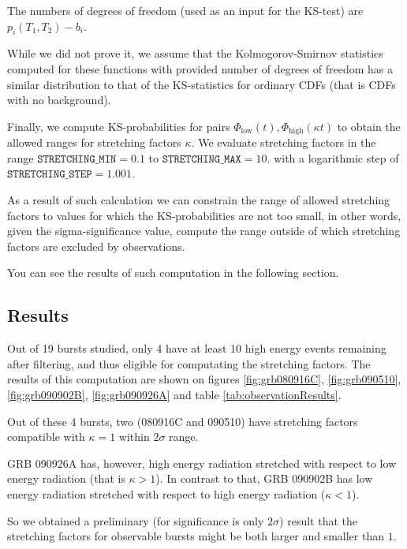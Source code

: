 \documentclass{article}
\begin{document}
The numbers of degrees of freedom (used as an input for the KS-test) are $p_i\left(T_1, T_2\right) - b_i$.

While we did not prove it, we assume that the Kolmogorov-Smirnov statistics computed for these functions with provided number of degrees of freedom has a similar distribution to that of the KS-statistics for ordinary CDFs (that is CDFs with no background).

Finally, we compute KS-probabilities for pairs $\Phi_\text{low}\left(t\right), \Phi_\text{high}\left(\kappa t\right)$ to obtain the allowed ranges for stretching factors $\kappa$. We evaluate stretching factors in the range $\texttt{STRETCHING\_MIN} = 0.1$ to $\texttt{STRETCHING\_MAX} = 10.$ with a logarithmic step of $\texttt{STRETCHING\_STEP} = 1.001$.

As a result of such calculation we can constrain the range of allowed stretching factors to values for which the KS-probabilities are not too small, in other words, given the sigma-significance value, compute the range outside of which stretching factors are excluded by observations.

You can see the results of such computation in the following section.

\subsection{Results}

Out of 19 bursts studied, only 4 have at least 10 high energy events remaining after filtering, and thus eligible for computating the stretching factors. The results of this computation are shown on figures \ref{fig:grb080916C}, \ref{fig:grb090510}, \ref{fig:grb090902B}, \ref{fig:grb090926A} and table \ref{tab:observationResults}.

Out of these 4 bursts, two (080916C and 090510) have stretching factors compatible with $\kappa = 1$ within $2\sigma$ range.

GRB 090926A has, however, high energy radiation stretched with respect to low energy radiation (that is $\kappa > 1$). In contrast to that, GRB 090902B has low energy radiation stretched with respect to high energy radiation ($\kappa < 1$).

So we obtained a preliminary (for significance is only $2\sigma$) result that the stretching factors for observable bursts might be both larger and smaller than $1$.
\end{document}
